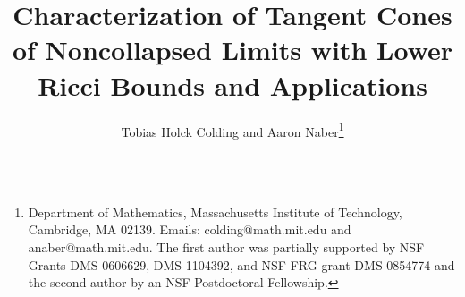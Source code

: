 \documentclass[11pt]{article}
\begin{document}
\newtheorem{theorem}{Theorem}[section]

\newtheorem{proposition}{Proposition}[section]

\newtheorem{lemma}{Lemma}[section]

\newtheorem{corollary}{Corollary}[section]

\newtheorem{conjecture}{Conjecture}[section]

\theoremstyle{definition}
\newtheorem{definition}{Definition}[section]

\theoremstyle{remark}
\newtheorem{remark}{Remark}[section]

\theoremstyle{remark}
\newtheorem{example}{Example}[section]

\theoremstyle{remark}
\newtheorem{note}{Note}[section]

\theoremstyle{remark}
\newtheorem{question}{Question}[section]

\newenvironment{myindentpar}[1]%
{\begin{list}{}%
         {\setlength{\leftmargin}{#1}}%
         \item[]%
}
{\end{list}}


\title{Characterization of Tangent Cones of Noncollapsed Limits with Lower Ricci Bounds and Applications}

\author{Tobias Holck Colding and Aaron Naber\thanks{Department of Mathematics, Massachusetts Institute of Technology, Cambridge, MA 02139.  Emails: colding@math.mit.edu and anaber@math.mit.edu.
         The  first author
was partially supported by NSF Grants DMS  0606629, DMS 1104392,  and NSF FRG grant DMS
 0854774 and the second author by an NSF Postdoctoral Fellowship.}}

\end{document}
